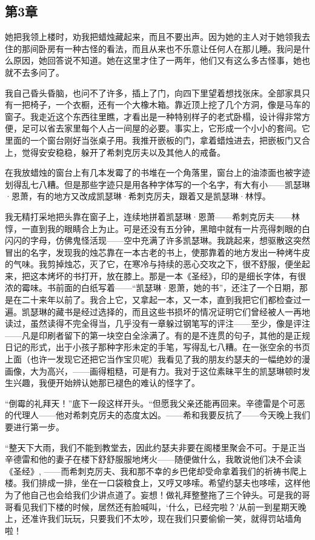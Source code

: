 \subsection{第3章}

\par 她把我领上楼时，劝我把蜡烛藏起来，而且不要出声。因为她的主人对于她领我去住的那间卧房有一种古怪的看法，而且从来也不乐意让任何人在那儿睡。我问是什么原因，她回答说不知道。她在这里才住了一两年，他们又有这么多古怪事，她也就不去多问了。
\par 我自己昏头昏脑，也问不了许多，插上了门，向四下里望着想找张床。全部家具只有一把椅子，一个衣橱，还有一个大橡木箱。靠近顶上挖了几个方洞，像是马车的窗子。我走近这个东西往里瞧，才看出是一种特别样子的老式卧榻，设计得非常方便，足可以省去家里每个人占一间屋的必要。事实上，它形成一个小小的套间。它里面的一个窗台刚好当张桌子用。我推开嵌板的门，拿着蜡烛进去，把嵌板门又合上，觉得安安稳稳，躲开了希刺克厉夫以及其他人的戒备。
\par 在我放蜡烛的窗台上有几本发霉了的书堆在一个角落里，窗台上的油漆面也被字迹划得乱七八糟。但是那些字迹只是用各种字体写的一个名字，有大有小——凯瑟琳·恩萧，有的地方又改成凯瑟琳·希刺克厉夫，跟着又是凯瑟琳·林惇。
\par 我无精打采地把头靠在窗子上，连续地拼着凯瑟琳·恩萧——希刺克厉夫——林惇，一直到我的眼睛合上为止。可是还没有五分钟，黑暗中就有一片亮得刺眼的白闪闪的字母，仿佛鬼怪活现——空中充满了许多凯瑟琳。我跳起来，想驱散这突然冒出的名字，发现我的烛芯靠在一本古老的书上，使那靠着的地方发出一种烤牛皮的气味。我剪掉烛芯，灭了它，在寒冷与持续的恶心交攻之下，很不舒服，便坐起来，把这本烤坏的书打开，放在膝上。那是一本《圣经》，印的是细长字体，有很浓的霉味。书前面的白纸写着——“凯瑟琳·恩萧，她的书”，还注了一个日期，那是在二十来年以前了。我合上它，又拿起一本，又一本，直到我把它们都检查过一遍。凯瑟琳的藏书是经过选择的，而且这些书损坏的情况证明它们曾经被人一再地读过，虽然读得不完全得当，几乎没有一章躲过钢笔写的评注——至少，像是评注——凡是印刷者留下的第一块空白全涂满了。有的是不连贯的句子，其他的是正规日记的形式，出于小孩子那种字形未定的手笔，写得乱七八糟。在一张空余的书页上面（也许一发现它还把它当作宝贝呢）我看见了我的朋友约瑟夫的一幅绝妙的漫画像，大为高兴，——画得粗糙，可是有力。我对于这位素昧平生的凯瑟琳顿时发生兴趣，我便开始辨认她那已褪色的难认的怪字了。
\par “倒霉的礼拜天！”底下一段这样开头。“但愿我父亲还能再回来。辛德雷是个可恶的代理人——他对希刺克厉夫的态度太凶。——希和我要反抗了——今天晚上我们要进行第一步。
\par “整天下大雨，我们不能到教堂去，因此约瑟夫非要在阁楼里聚会不可。于是正当辛德雷和他的妻子在楼下舒舒服服地烤火——随便做什么，我敢说他们决不会读《圣经》, ——而希刺克厉夫、我和那不幸的乡巴佬却受命拿着我们的祈祷书爬上楼。我们排成一排，坐在一口袋粮食上，又哼又哆嗦。希望约瑟夫也哆嗦，这样他为了他自己也会给我们少讲点道了。妄想！做礼拜整整拖了三个钟头。可是我的哥哥看见我们下楼的时候，居然还有脸喊叫，‘什么，已经完啦？’从前一到星期天晚上，还准许我们玩玩，只要我们不太吵，现在我们只要偷偷一笑，就得罚站墙角啦！

